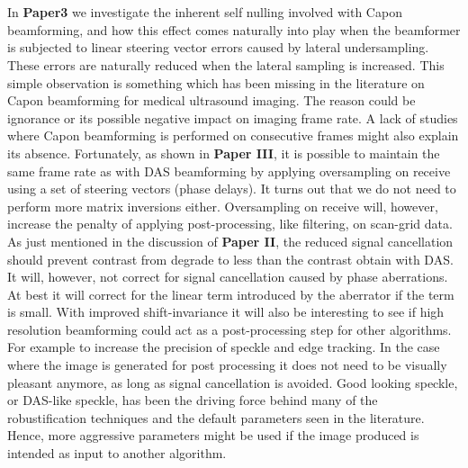 \\\\
In \textbf{Paper3} we investigate the inherent self nulling involved with Capon beamforming, and how this effect comes naturally into play when the beamformer is subjected to linear steering vector errors caused by lateral undersampling. These errors are naturally reduced when the lateral sampling is increased. This simple observation is something which has been missing in the literature on Capon beamforming for medical ultrasound imaging. The reason could be ignorance or its possible negative impact on imaging frame rate. A lack of studies where Capon beamforming is performed on consecutive frames might also explain its absence. Fortunately, as shown in \textbf{Paper III}, it is possible to maintain the same frame rate as with DAS beamforming by applying oversampling on receive using a set of steering vectors (phase delays). It turns out that we do not need to perform more matrix inversions either. Oversampling on receive will, however,  increase the penalty of applying post-processing, like filtering,  on scan-grid data. %
As just mentioned in the discussion of \textbf{Paper II}, the reduced signal cancellation should prevent contrast from degrade to less than the contrast obtain with DAS. It will, however,  not correct for signal cancellation caused by phase aberrations. At best it will correct for the linear term introduced by the aberrator if the term is small.
With improved shift-invariance it will also be interesting to see if high resolution beamforming could act as a post-processing step for other algorithms. For example to increase the precision of speckle and edge tracking. In the case where the image is generated for post processing it does not need to be visually pleasant anymore, as long as signal cancellation is avoided. Good looking speckle, or DAS-like speckle, has been the driving force behind many of the robustification techniques and the default parameters seen in the literature. Hence, more aggressive parameters might be used if the image produced is intended as input to another algorithm.
\\\\
